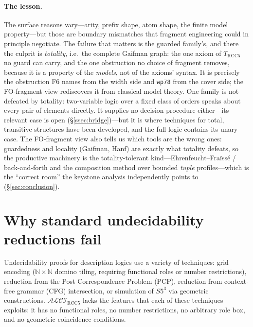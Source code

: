 \documentclass[11pt]{article}
\newcommand{\ALCIRCC}[1]{\mathcal{ALCI}_{\mathrm{RCC#1}}}
\newcommand{\naturals}{\mathbb{N}}
\theoremstyle{plain}
\theoremstyle{definition}
\begin{document}
\paragraph{The lesson.} The surface reasons vary---arity, prefix shape, atom
shape, the finite model property---but those are boundary mismatches that
fragment engineering could in principle negotiate. The failure that matters
is the guarded family's, and there the culprit is \emph{totality}, i.e.\ the
complete Gaifman graph: the one axiom of $T_{\mathrm{RCC5}}$ no guard can
carry, and the one obstruction no choice of fragment removes, because it is
a property of the \emph{models}, not of the axioms' syntax. It is precisely
the obstruction F6 names from the width side and \texttt{wp78} from the
cover side; the FO-fragment view rediscovers it from classical model theory.
One family is not defeated by totality: two-variable logic over a fixed class
of orders speaks about every pair of elements directly. It supplies no
decision procedure either---its relevant case is open
(\S\ref{ssec:bridge})---but it is where techniques for total, transitive
structures have been developed, and the full logic contains its unary case. The
FO-fragment view
also tells us which tools are the wrong ones: guardedness and locality
(Gaifman, Hanf) are exactly what totality defeats, so the productive
machinery is the totality-tolerant kind---Ehrenfeucht--Fra\"iss\'e /
back-and-forth and the composition method over bounded \emph{tuple}
profiles---which is the ``correct room'' the keystone analysis independently
points to (\S\ref{sec:conclusion}).


\section{Why standard undecidability reductions fail}
\label{sec:undec}


Undecidability proofs for description logics use a variety of
techniques: grid encoding ($\naturals \times \naturals$ domino
tiling, requiring functional roles or number restrictions),
reduction from the Post Correspondence Problem (PCP), reduction
from context-free grammar (CFG) intersection, or simulation of
$S5^3$ via geometric constructions.
$\ALCIRCC{5}$ lacks the features that each of these techniques
exploits: it has no functional roles, no number restrictions,
no arbitrary role box, and no geometric coincidence conditions.
\end{document}
